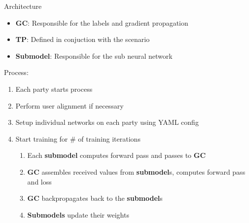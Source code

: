 \documentclass[xcolor=dvipsnames]{beamer}
\begin{document}
\begin{frame}{Architecture}
  \begin{itemize}
    \item {\bf GC}: Responsible for the labels and gradient propagation
    \item {\bf TP}: Defined in conjuction with the scenario
    \item {\bf Submodel}: Responsible for the sub neural network
  \end{itemize}
  Process:
  \begin{enumerate}
      \item Each party starts process
      \item Perform user alignment if necessary
      \item Setup individual networks on each party using YAML config
      \item Start training for \# of training iterations
          \begin{enumerate}
              \item Each \textbf{submodel} computes forward pass and passes to {\bf GC}
              \item {\bf GC} assembles received values from \textbf{submodel}s, computes forward pass and loss
              \item {\bf GC} backpropagates back to the \textbf{submodel}s
              \item {\bf Submodels} update their weights
          \end{enumerate}
  \end{enumerate}
\end{frame}
\end{document}
